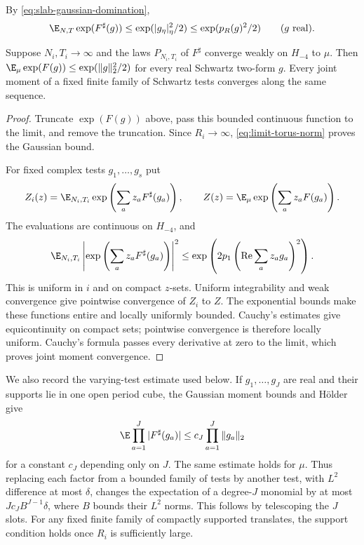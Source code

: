 By \eqref{eq:slab-gaussian-domination},
\begin{equation}\label{eq:limit-cutoff-G}
 \E_{N,T}\exp(F^\sharp(g))
       \le\exp(|g_\eta|_\eta^2/2)\le\exp(p_R(g)^2/2)
                          \qquad(g\text{ real}).
\end{equation}

\begin{proposition}\label{prop:vtm-periodic-moments}
Suppose $N_i,T_i\to\infty$ and the laws $P_{N_i,T_i}$ of
$F^\sharp$ converge weakly on $H_{-4}$ to $\mu$.
Then $\E_\mu\exp(F(g))\le\exp(\|g\|_2^2/2)$ for every real
Schwartz two-form $g$. Every joint moment of a fixed finite
family of Schwartz tests converges along the same sequence.
\end{proposition}

\begin{proof}
Truncate $\exp(F(g))$ above, pass this bounded continuous
function to the limit, and remove the truncation.
Since $R_i\to\infty$, \eqref{eq:limit-torus-norm} proves the
Gaussian bound.

For fixed complex tests $g_1,\ldots,g_s$ put
\[
 Z_i(z)=\E_{N_i,T_i}\exp\left(\sum_a z_aF^\sharp(g_a)\right),
 \qquad
 Z(z)=\E_\mu\exp\left(\sum_a z_aF(g_a)\right).
\]
The evaluations are continuous on $H_{-4}$, and
\[
 \E_{N_i,T_i}
 \left|\exp\left(\sum_a z_aF^\sharp(g_a)\right)\right|^2
 \le\exp\left(2p_1\left(\operatorname{Re}\sum_a z_ag_a\right)^2\right).
\]
This is uniform in $i$ and on compact $z$-sets.
Uniform integrability and weak convergence give pointwise
convergence of $Z_i$ to $Z$. The exponential bounds make
these functions entire and locally uniformly bounded.
Cauchy's estimates give equicontinuity on compact sets;
pointwise convergence is therefore locally uniform.
Cauchy's formula passes every derivative at zero to the limit,
which proves joint moment convergence.
\end{proof}

We also record the varying-test estimate used below.
If $g_1,\ldots,g_J$ are real and their supports lie in one
open period cube, the Gaussian moment bounds and H\"older
give
\[
 \E\prod_{a=1}^J|F^\sharp(g_a)|
                     \le c_J\prod_{a=1}^J\|g_a\|_2
\]
for a constant $c_J$ depending only on $J$.
The same estimate holds for $\mu$.
Thus replacing each factor from a bounded family of tests
by another test, with $L^2$ difference at most $\delta$,
changes the expectation of a degree-$J$ monomial by at most
$Jc_JB^{J-1}\delta$, where $B$ bounds their $L^2$ norms.
This follows by telescoping the $J$ slots. For any fixed
finite family of compactly supported translates, the
support condition holds once $R_i$ is sufficiently large.

